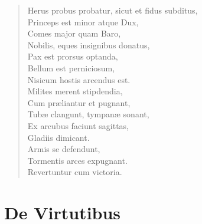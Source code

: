 \documentclass[12pt,  postvopaper]{memoir}
\begin{document}
\begin{verse}
  Herus probus probatur, sicut et fidus subditus,\\
  Princeps est minor atque Dux,\\
  Comes major quam Baro,\\
  Nobilis, eques insignibus donatus,\\
  Pax est prorsus optanda,\\
  Bellum est perniciosum,\\
  Nisicum hostis arcendus est.\\
  Milites merent stipdendia,\\
  Cum præliantur et pugnant,\\
  Tubæ clangunt, tympanæ sonant,\\
  Ex arcubus faciunt sagittas,\\
  Gladiis dimicant.\\
  Armis se defendunt,\\
  Tormentis arces expugnant.\\
  Revertuntur cum victoria.\\
\end{verse}


\chapter{De Virtutibus}
\end{document}
